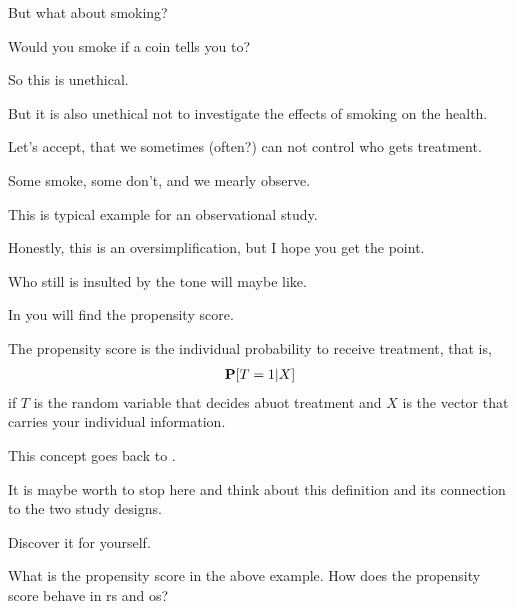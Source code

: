 But what about smoking?

Would you smoke if a coin tells you to?

So this is unethical.

But it is also unethical not to investigate the effects of smoking on the health.

Let's accept, that we sometimes (often?) can not control who gets treatment.

Some smoke, some don't, and we mearly observe.

This is typical example for an observational study.

Honestly, this is an oversimplification, but I hope you get the point.

Who still is insulted by the tone will maybe like\cite{Rubin2007}.


In \cite{Rubin2007} you will find the propensity score.

The propensity score is the individual probability to receive treatment, that is,
\begin{gather}
  \P
  [T=1|X]
\end{gather}
if $T$ is the random variable that decides abuot treatment and $X$ is the vector that carries your individual information.

This concept goes back to \cite{Rosenbaum1983}.

It is maybe worth to stop here and think about this definition and its connection to the two study designs.

Discover it for yourself.

\begin{reflection*}
What is the propensity score in the above example.
How does the propensity score behave in rs and os?
\end{reflection*}






